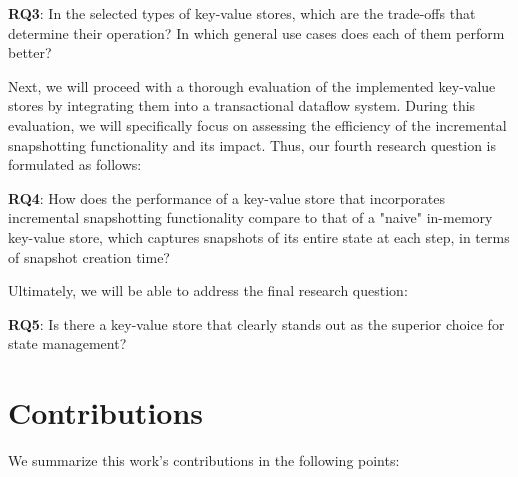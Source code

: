 \begin{tcolorbox}
    \textbf{RQ3}: In the selected types of key-value stores, which are the trade-offs that determine their operation? In which general use cases does each of them perform better?
\end{tcolorbox}
\vspace{8px}

Next, we will proceed with a thorough evaluation of the implemented key-value stores by integrating them into a transactional dataflow system. During this evaluation, we will specifically focus on assessing the efficiency of the incremental snapshotting functionality and its impact. Thus, our fourth research question is formulated as follows:\\

\begin{tcolorbox}
    \textbf{RQ4}: How does the performance of a key-value store that incorporates incremental snapshotting functionality compare to that of a "naive" in-memory key-value store, which captures snapshots of its entire state at each step, in terms of snapshot creation time?
\end{tcolorbox}
\vspace{8px}

Ultimately, we will be able to address the final research question:\\

\begin{tcolorbox}
    \textbf{RQ5}: Is there a key-value store that clearly stands out as the superior choice for state management?
\end{tcolorbox}
\vspace{8px}

\section{Contributions}

We summarize this work's contributions in the following points:


